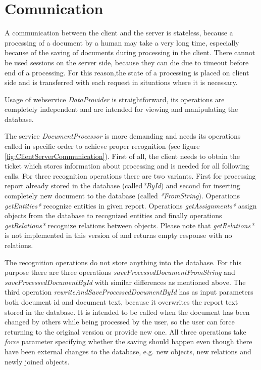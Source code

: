\section{Comunication}

A communication between the client and the server is stateless, because a processing
of a document by a human may take a very long time, especially because of the saving
of documents during processing in the client. There cannot be used sessions on
the server side, because they can die due to timeout before end of a processing.
For this reason,the state of a processing is placed on client side and is transferred
with each request in situations where it is necessary.

Usage of webservice \emph{DataProvider} is straightforward, its operations are
completely independent and are intended for viewing and manipulating
the database.

The service \emph{DocumentProcessor} is more demanding and needs its operations
called in specific order to achieve proper recognition (see figure
\ref{fig:ClientServerCommunication}). First of all, the client needs to obtain
the ticket which stores information about processing and is needed for all
following calls. For three recognition operations there are two variants. First
for processing report already stored in the database (called\emph{*ById}) and
second for inserting completely new document to the database (called
\emph{*FromString}). Operations \emph{getEntities*} recognize entities in
given report. Operations \emph{getAssignments*} assign objects from the database
to recognized entities and finally operations \emph{getRelations*} recognize
relations between objects. Please note that \emph{getRelations*} is not
implemented in this version of \textan{} and returns empty response with no
relations.

The recognition operations do not store anything into the database. For this
purpose there are three operations \emph{saveProcessedDocumentFromString} and
\emph{saveProcessedDocumentById} with similar differences as mentioned above.
The third operation \emph{rewriteAndSaveProcessedDocumentById} has as input
parameters both document id and document text, because it overwrites the report
text stored in the database. It is intended to be called when the document has
been changed by others while being processed by the user, so the user can
force returning to the original version or provide new one. All three operations
take \emph{force} parameter specifying whether the saving should happen even
though there have been external changes to the database, e.g. new objects, new
relations and newly joined objects.

